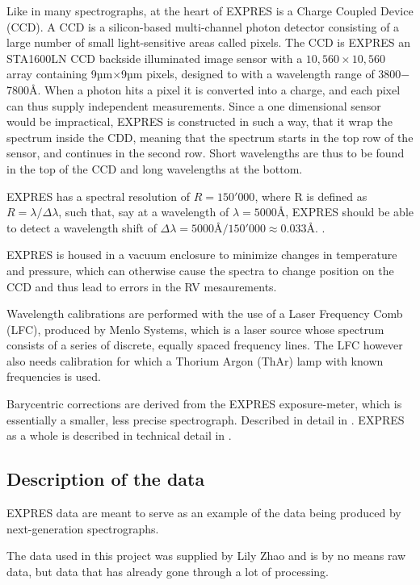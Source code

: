 Like in many spectrographs, at the heart of EXPRES is a Charge Coupled Device (CCD). A CCD is a silicon-based multi-channel photon detector consisting of a large number of small light-sensitive areas called pixels. The CCD is EXPRES an STA1600LN CCD backside illuminated image sensor with a $10,560 \times 10,560$ array containing 9µm$\times$9µm pixels, designed to with a wavelength range of 3800$-$7800Å. When a photon hits a pixel it is converted into a charge, and each pixel can thus supply independent measurements. Since a one dimensional sensor would be impractical, EXPRES is constructed in such a way, that it wrap the spectrum inside the CDD, meaning that the spectrum starts in the top row of the sensor, and continues in the second row. Short wavelengths are thus to be found in the top of the CCD and long wavelengths at the bottom.

EXPRES has a spectral resolution of $R = 150'000$, where R is defined as $R = \lambda / \Delta\lambda$, such that, say at a wavelength of $\lambda = 5000$Å, EXPRES should be able to detect a wavelength shift of $\Delta\lambda = 5000\text{Å}/150'000 \approx 0.033 $Å. . 

EXPRES is housed in a vacuum enclosure to minimize changes in temperature and pressure, which can otherwise cause the spectra to change position on the CCD and thus lead to errors in the RV mesaurements. 

Wavelength calibrations are performed with the use of a Laser Frequency Comb 
(LFC), produced by Menlo Systems, which is a laser source whose spectrum consists of a series of discrete, equally spaced frequency lines. The LFC however also needs calibration for which a Thorium Argon (ThAr) lamp with known frequencies is used.

Barycentric corrections are derived from the EXPRES exposure-meter, which is essentially a smaller, less precise spectrograph. Described in detail in \cite{barycentric_exposure_meter_blackman}. EXPRES as a whole is described in technical detail in \cite{EXPRES_technical_details_Jurgenson}.


\subsection{Description of the data}
EXPRES data are meant to serve as an example of the data being produced by next-generation spectrographs. 

The data used in this project was supplied by Lily Zhao and is by no means raw data, but data that has already gone through a lot of processing.

